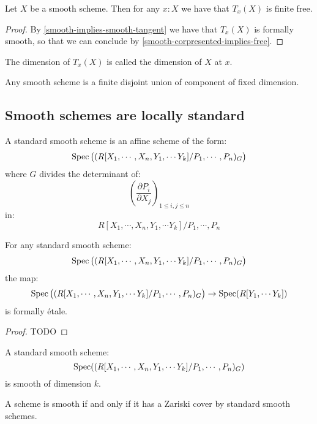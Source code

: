 \begin{proposition}\label{smooth-have-free-tangent}
Let $X$ be a smooth scheme. Then for any $x:X$ we have that $T_x(X)$ is finite free.
\end{proposition}

\begin{proof}
By \cref{smooth-implies-smooth-tangent} we have that $T_x(X)$ is formally smooth, so that we can conclude by \cref{smooth-corpresented-implies-free}.
\end{proof}

The dimension of $T_x(X)$ is called the dimension of $X$ at $x$.

\begin{corollary}
Any smooth scheme is a finite disjoint union of component of fixed dimension.
\end{corollary}

\subsection{Smooth schemes are locally standard}

\begin{definition}
A standard smooth scheme is an affine scheme of the form:
\[\operatorname{Spec}\big((R[X_1,\cdots,X_n,Y_1,\cdots Y_{k}] / P_1,\cdots,P_n)_G\big)\]
where $G$ divides the determinant of:
\[\left( \frac{\partial P_i}{\partial X_j}\right)_{1\leq i,j\leq n}\]
in:
\[R[X_1,\cdots,X_n,Y_1,\cdots Y_{k}] / P_1,\cdots,P_n\]
\end{definition}

\begin{lemma}\label{standard-smooth-etale-over-A}
For any standard smooth scheme:
\[\operatorname{Spec}\big((R[X_1,\cdots,X_n,Y_1,\cdots Y_{k}] / P_1,\cdots,P_n)_G\big)\]
the map:
\[\operatorname{Spec}\big((R[X_1,\cdots,X_n,Y_1,\cdots Y_{k}] / P_1,\cdots,P_n)_G\big) \to \operatorname{Spec}(R[Y_1,\cdots Y_{k}])\]
is formally étale.
\end{lemma}

\begin{proof}
TODO
\end{proof}

\begin{corollary}
A standard smooth scheme:
\[\operatorname{Spec}((R[X_1,\cdots,X_n,Y_1,\cdots Y_{k}] / P_1,\cdots,P_n)_G)\]
is smooth of dimension $k$.
\end{corollary}

\begin{proposition}\label{smooth-are-locally-standard}
A scheme is smooth if and only if it has a Zariski cover by standard smooth schemes.
\end{proposition}

